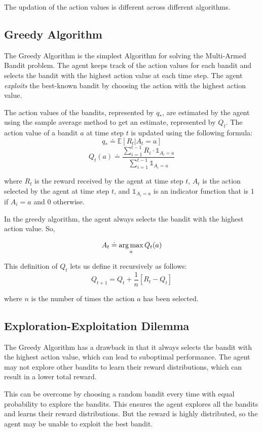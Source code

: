 The updation of the action values is different across different algorithms.

\subsection{Greedy Algorithm}

The Greedy Algorithm is the simplest Algorithm for solving the Multi-Armed Bandit problem. The agent keeps track of the action values for each bandit and selects the bandit with the highest action value at each time step. The agent \textit{exploits} the best-known bandit by choosing the action with the highest action value.

The action values of the bandits, represented by $q_{\ast}$, are estimated by the agent using the sample average method to get an estimate, represented by $Q_t$. The action value of a bandit $a$ at time step $t$ is updated using the following formula:
\[q_\ast\doteq \mathds{E} [R_t|A_t=a]\]
\[Q_t(a)\doteq \frac{\sum_{i=1}^{t-1} R_i \cdot \mathds{1}_{A_i=a}}{\sum_{i=1}^{t-1} \mathds{1}_{A_i=a}}\]

where $R_t$ is the reward received by the agent at time step $t$, $A_t$ is the action selected by the agent at time step $t$, and $\mathds{1}_{A_i=a}$ is an indicator function that is $1$ if $A_i=a$ and $0$ otherwise.

In the greedy algorithm, the agent always selects the bandit with the highest action value. So,

\[A_t \doteq \operatorname*{arg\,max}_{a} Q_t(a)\]

This definition of $Q_t$ lets us define it recursively as follows:
\[Q_{t+1} = Q_t + \frac{1}{n}[R_t - Q_t]\]

where $n$ is the number of times the action $a$ has been selected.

\subsection{Exploration-Exploitation Dilemma}

The Greedy Algorithm has a drawback in that it always selects the bandit with the highest action value, which can lead to suboptimal performance. The agent may not explore other bandits to learn their reward distributions, which can result in a lower total reward.

This can be overcome by choosing a random bandit every time with equal probability to explore the bandits. This ensures the agent explores all the bandits and learns their reward distributions. But the reward is highly distributed, so the agent may be unable to exploit the best bandit.

